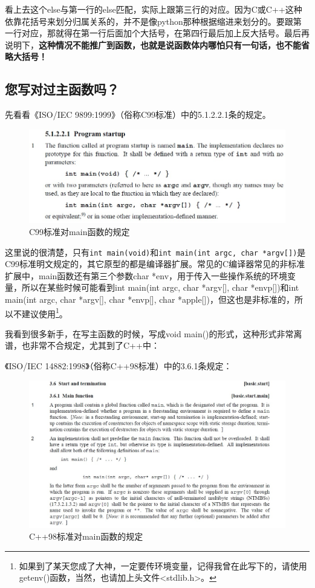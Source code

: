 \documentclass[11pt,twoside,a4paper,titlepage]{article}	%
\begin{document}
看上去这个else与第一行的else匹配，实际上跟第三行的对应。因为C或C++这种依靠花括号来划分归属关系的，并不是像python那种根据缩进来划分的。要跟第一行对应，那就得在第一行后面加个大括号，在第四行最后加上反大括号。最后再说明下，\textbf{这种情况不能推广到函数，也就是说函数体内哪怕只有一句话，也不能省略大括号！}

\subsection{您写对过主函数吗？}

先看看《ISO/IEC 9899:1999》（俗称C99标准）中的5.1.2.2.1条的规定。

\begin{figure}[bphtH]
\centering
\includegraphics[scale=.5]{../src/C99main.jpg}
\caption{C99标准对main函数的规定}
\label{fig:C99main}
\end{figure}

这里说的很清楚，只有\verb|int main(void)|和\verb|int main(int argc, char *argv[])|是C99标准明文规定的，其它原型的都是编译器扩展。常见的C编译器常见的非标准扩展中，main函数还有第三个参数char *env，用于传入一些操作系统的环境变量，所以在某些时候可能看到int main(int argc, char *argv[], char *envp[])和int main(int argc, char *argv[], char *envp[], char *apple[])，但这也是非标准的，所以不建议使用\footnote{如果到了某天您成了大神，一定要传环境变量，记得我曾在此写下的，请使用getenv()函数，当然，也请加上头文件<stdlib.h>。}。

我看到很多新手，在写主函数的时候，写成void main()的形式，这种形式非常离谱，也非常不合规定，尤其到了C++中：

《ISO/IEC 14882:1998》（俗称C++98标准）中的3.6.1条规定：

\begin{figure}[H]
\centering
\includegraphics[scale=.5]{../src/cpp98main.jpg}
\caption{C++98标准对main函数的规定}
\label{fig:cpp98main}
\end{figure}
\end{document}
